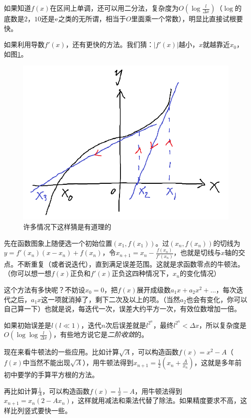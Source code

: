 如果知道$f(x)$在区间上单调，还可以用二分法，复杂度为$O(\log \frac{l}{\Delta x})$（$\log$的底数是$2$，$10$还是$\mathrm{e}$之类的无所谓，相当于$O$里面乘一个常数），明显比直接试根要快。

如果利用导数$f'(x)$，还有更快的方法。我们猜：$|f'(x)|$越小，$x$就越靠近$x_0$，如图\ref{fig-newton-iter}。
\begin{figure}[htb]
\centering
\includegraphics[scale=0.5]{fig/newton-iter.png}
\caption{许多情况下这样猜是有道理的}
\label{fig-newton-iter}
\end{figure}

先在函数图象上随便选一个初始位置$(x_1,f(x_1))$。过$(x_n,f(x_n))$的切线为$y=f'(x_n)(x-x_n)+f(x_n)$，令$x_{n+1}=x_n-\frac{f(x_n)}{f'(x_n)}$，也就是切线与$x$轴的交点。不断重复（或者说迭代），直到满足误差范围。这就是求函数零点的牛顿法。（你可以想一想$f(x)$正负和$f'(x)$正负这四种情况下，$x_n$的变化情况）

这个方法有多快呢？不妨设$x_0=0$，把$f(x)$展开成级数$a_1 x+a_2 x^2+\dots$，每次迭代之后，$a_1 x$这一项就消掉了，剩下二次及以上的项。（当然$a_2$也会有变化，你可以自己算一下）也就是说，每迭代一次，误差大约平方一次，有效位数增加一倍。

如果初始误差是$l(l \ll 1)$，迭代$n$次后误差就是$l^{2^n}$，最终$l^{2^n}<\Delta x$，所以复杂度是$O(\log \log \frac{l}{\Delta x})$，有些地方说它是\emph{二阶收敛}的。

现在来看牛顿法的一些应用。比如计算$\sqrt{A}$，可以构造函数$f(x)=x^2-A$（$f(x)$中当然不能出现$\sqrt{A}$），用牛顿法得到$x_{n+1}=\frac{1}{2}(x_n+\frac{A}{x_n})$，这就是多年前初中要学的手算平方根的方法。

再比如计算$\frac{1}{A}$，可以构造函数$f(x)=\frac{1}{x}-A$，用牛顿法得到$x_{n+1}=x_n(2-A x_n)$，这样就用减法和乘法代替了除法。如果精度要求不高，这样比列竖式要快一些。

